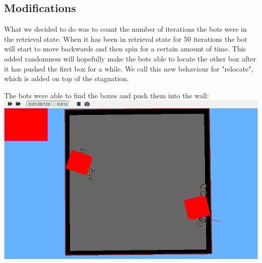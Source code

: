 \documentclass[12pt, a4paper]{article}
\begin{document}
\subsection{Modifications}
What we decided to do was to count the number of iterations the bots were in the retrieval state. When it has been in retrieval state for 50 iterations the bot will start to move backwards and then spin for a certain amount of time. This added randomness will hopefully make the bots able to locate the other box after it has pushed the first box for a while.
We call this new behaviour for "relocate", which is added on top of the stagnation.

The bots were able to find the boxes and push them into the wall:\\
\includegraphics[width=\linewidth]{1.finalStateMulti.png}
\end{document}
